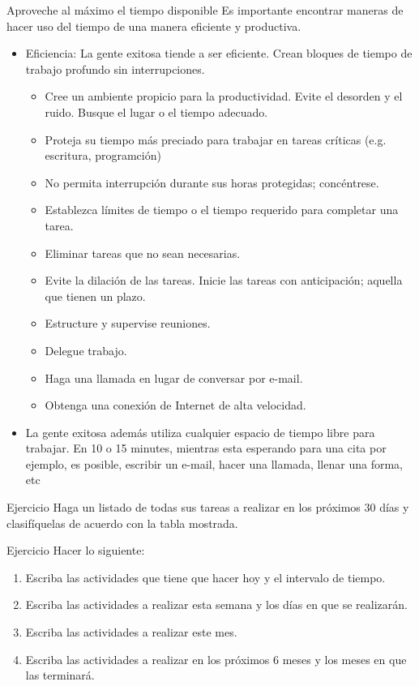 \documentclass[
10pt,
aspectratio=169,
]{beamer}
\begin{document}
\begin{frame}[c]{Aproveche al m\'aximo el tiempo disponible}
Es importante encontrar maneras de hacer uso del tiempo de una manera \alert{eficiente} y \alert{productiva}.
\begin{itemize}
\item \alert{Eficiencia}: La gente exitosa tiende a ser eficiente. Crean bloques de tiempo de trabajo profundo sin interrupciones.
\begin{itemize}
\item Cree un ambiente propicio para la productividad. Evite el desorden y el ruido. Busque el lugar o el tiempo adecuado.
\item Proteja su tiempo m\'as preciado para trabajar en tareas cr\'iticas (e.g. escritura, programci\'on)
\item No permita interrupción durante sus horas protegidas; concéntrese. 
\item Establezca l\'imites de tiempo o el tiempo requerido para completar una tarea.
\item Eliminar tareas que no sean necesarias.
\item Evite la dilaci\'on de las tareas. Inicie las tareas con anticipaci\'on; aquella que tienen un plazo.
\item Estructure y supervise reuniones.
\item Delegue trabajo.
\item Haga una llamada en lugar de conversar por e-mail.
\item Obtenga una conexi\'on de Internet de alta velocidad. 
\end{itemize}
\item La gente exitosa adem\'as utiliza cualquier espacio de tiempo libre para trabajar. En 10 o 15 minutes, mientras esta esperando para una cita por ejemplo, es posible, escribir un e-mail, hacer una llamada, llenar una forma, etc
\end{itemize}
\end{frame}

\begin{frame}[c]{Ejercicio}
Haga un listado de todas sus tareas a realizar en los  pr\'oximos 30 d\'ias y clasif\'iquelas de acuerdo con la tabla mostrada.
\end{frame}

\begin{frame}[c]{Ejercicio}
Hacer lo siguiente:
\begin{enumerate}
\item Escriba las actividades  que tiene que hacer hoy y el intervalo de tiempo.
\item Escriba las actividades a realizar esta semana y los d\'ias en que se realizar\'an.
\item Escriba las actividades a realizar este mes.
\item Escriba las actividades a realizar en los pr\'oximos 6 meses y los meses en que las terminar\'a. 
\end{enumerate}
\end{frame}
\end{document}
